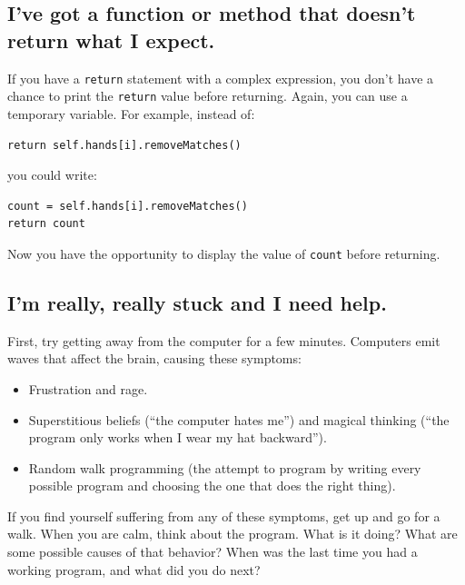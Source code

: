 \documentclass[10pt]{book}
\begin{document}
\subsection{I've got a function or method that doesn't return what I
expect.}

If you have a {\tt return} statement with a complex expression,
you don't have a chance to print the {\tt return} value before
returning.  Again, you can use a temporary variable.  For
example, instead of:

\begin{verbatim}
return self.hands[i].removeMatches()
\end{verbatim}
%
you could write:

\begin{verbatim}
count = self.hands[i].removeMatches()
return count
\end{verbatim}
%
Now you have the opportunity to display the value of
{\tt count} before returning.


\subsection{I'm really, really stuck and I need help.}

First, try getting away from the computer for a few minutes.
Computers emit waves that affect the brain, causing these
symptoms:

\begin{itemize}

\item Frustration and rage.

\item Superstitious beliefs (``the computer hates me'') and
magical thinking (``the program only works when I wear my
hat backward'').

\item Random walk programming (the attempt to program by writing
every possible program and choosing the one that does the right
thing).

\end{itemize}

If you find yourself suffering from any of these symptoms, get
up and go for a walk.  When you are calm, think about the program.
What is it doing?  What are some possible causes of that
behavior?  When was the last time you had a working program,
and what did you do next?
\end{document}
